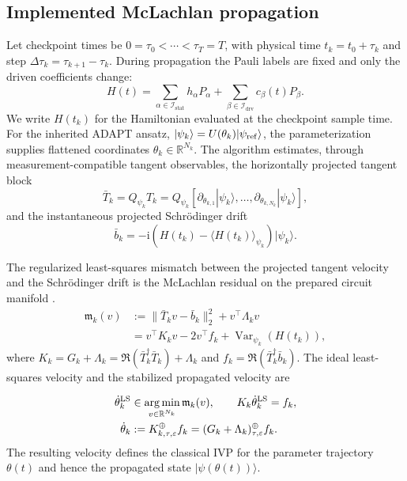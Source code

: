 \documentclass[
  reprint,
  amsmath,
  amssymb,
  aps,
  pra,
  nofootinbib,
  superscriptaddress,
  floatfix
]{revtex4-2}
\newcommand{\placeholder}[1]{\textcolor{red!70!black}{\ifmmode\left[#1\right]\else\textsf{[#1]}\fi}}
\newcommand{\ii}{\mathrm{i}}
\newcommand{\stat}{\mathrm{stat}}
\newcommand{\drv}{\mathrm{drv}}
\newcommand{\Var}{\operatorname{Var}}
\newcommand{\argminp}{\mathop{\mathrm{arg\,min}}}
\newcommand{\eps}{\varepsilon}
\newcommand{\ket}[1]{|#1\rangle}
\newcommand{\expval}[1]{\langle #1\rangle}
\begin{document}
\subsection{Implemented McLachlan propagation}
Let checkpoint times be $0=\tau_0<\cdots<\tau_T=T$, with physical time $t_k=t_0+\tau_k$ and step $\Delta\tau_k=\tau_{k+1}-\tau_k$. During propagation the Pauli labels are fixed and only the driven coefficients change:
\begin{equation}
H(t)=\sum_{\alpha\in\mathcal I_{\stat}}h_\alpha P_\alpha
+\sum_{\beta\in\mathcal I_{\drv}}c_\beta(t)P_\beta .
\label{eq:dynamics_sampling}
\end{equation}
We write $H(t_k)$ for the Hamiltonian evaluated at the checkpoint sample time.
For the inherited ADAPT ansatz, $\ket{\psi_k}=U(\theta_k)\ket{\psi_{\rm ref}}$, the parameterization supplies flattened coordinates $\theta_k\in\mathbb R^{N_k}$. The algorithm estimates, through measurement-compatible tangent observables, the horizontally projected tangent block
\begin{equation}
\bar T_k=Q_{\psi_k}T_k
=Q_{\psi_k}\left[
\partial_{\theta_{k,1}}\ket{\psi_k},\ldots,
\partial_{\theta_{k,N_k}}\ket{\psi_k}
\right],
\label{eq:projected_tangent_block}
\end{equation}
and the instantaneous projected Schrödinger drift
\begin{equation}
\bar b_k=-\ii\left(H(t_k)-\expval{H(t_k)}_{\psi_k}\right)\ket{\psi_k}.
\label{eq:projected_schrodinger_drift}
\end{equation}

The regularized least-squares mismatch between the projected tangent velocity and the Schrödinger drift is the McLachlan residual on the prepared circuit manifold \cite{McLachlan1964,Yuan2019VQS,Barison2021}.
\begin{equation}
\begin{aligned}
\mathfrak m_k(v)
&:=\|\bar T_kv-\bar b_k\|_2^2
+v^\top\Lambda_kv \\
&=v^\top K_kv-2v^\top f_k+\Var_{\psi_k}(H(t_k)),
\end{aligned}
\label{eq:mclachlan_metric_objective}
\end{equation}
where $K_k=G_k+\Lambda_k=\Re(\bar T_k^\dagger\bar T_k)+\Lambda_k$ and $f_k=\Re(\bar T_k^\dagger\bar b_k)$. The ideal least-squares velocity and the stabilized propagated velocity are

\begin{equation}
\begin{aligned}
\dot\theta_k^{\rm LS}
&\in\argminp_{v\in\mathbb R^{N_k}}\mathfrak m_k(v),
\qquad
K_k\dot\theta_k^{\rm LS}=f_k,\\
\dot\theta_k
&:=K_{k,\tau,\eps}^{\oplus}f_k
=(G_k+\Lambda_k)_{\tau,\eps}^{\oplus}f_k .
\end{aligned}
\label{eq:mclachlan_velocity}
\end{equation}
The resulting velocity defines the classical IVP for the parameter trajectory $\theta(t)$ and hence the propagated state $\ket{\psi(\theta(t))}$.
\end{document}
